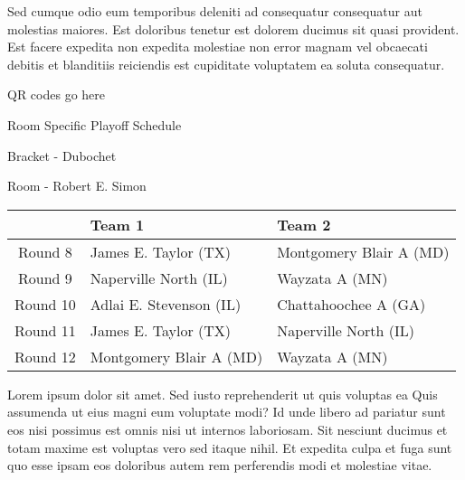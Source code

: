 \documentclass{article}%
\begin{document}
\newline%
Sed cumque odio eum temporibus deleniti ad consequatur consequatur aut molestias maiores. Est doloribus tenetur est dolorem ducimus sit quasi provident. Est facere expedita non expedita molestiae non error magnam vel obcaecati debitis et blanditiis reiciendis est cupiditate voluptatem ea soluta consequatur.%
\vspace*{140pt}%
\begin{center}%
\begin{Huge}%
QR codes go here%
\end{Huge}%
\end{center}%
\newpage%
\begin{center}%
\begin{Huge}%
Room Specific Playoff Schedule%
\end{Huge}%
\vspace*{8pt}%
\linebreak%
\begin{Large}%
Bracket {-} Dubochet%
\end{Large}%
\vspace*{8pt}%
\linebreak%
\vspace*{8pt}%
\begin{Large}%
Room {-} Robert E. Simon%
\end{Large}%
\end{center}%
%
\begin{tabularx}{\textwidth}{|c|Y|Y|}%
\hline%
&Team 1&Team 2\\%
\hline%
Round 8&James E. Taylor (TX)&Montgomery Blair A (MD)\\%
Round 9&Naperville North (IL)&Wayzata A (MN)\\%
Round 10&Adlai E. Stevenson (IL)&Chattahoochee A (GA)\\%
Round 11&James E. Taylor (TX)&Naperville North (IL)\\%
Round 12&Montgomery Blair A (MD)&Wayzata A (MN)\\%
\hline%
\end{tabularx}%
\vspace*{8pt}%
\newline%
Lorem ipsum dolor sit amet. Sed iusto reprehenderit ut quis voluptas ea Quis assumenda ut eius magni eum voluptate modi? Id unde libero ad pariatur sunt eos nisi possimus est omnis nisi ut internos laboriosam. Sit nesciunt ducimus et totam maxime est voluptas vero sed itaque nihil. Et expedita culpa et fuga sunt quo esse ipsam eos doloribus autem rem perferendis modi et molestiae vitae.\newline%
\end{document}
